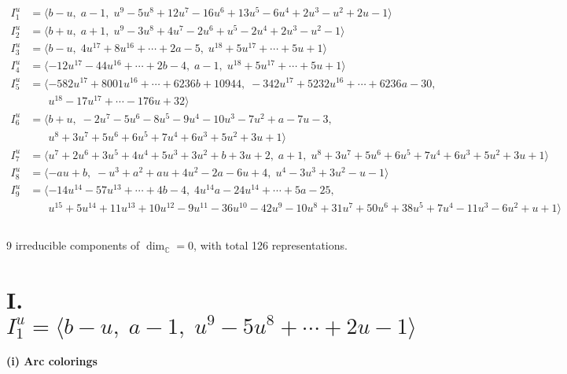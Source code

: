 \documentclass[1p]{elsarticle_modified}
\theoremstyle{definition}
\begin{document}
\begin{align*}
I^u_{1}&=\langle 
b- u,\;a-1,\;u^9-5 u^8+12 u^7-16 u^6+13 u^5-6 u^4+2 u^3- u^2+2 u-1\rangle \\
I^u_{2}&=\langle 
b+u,\;a+1,\;u^9-3 u^8+4 u^7-2 u^6+u^5-2 u^4+2 u^3- u^2-1\rangle \\
I^u_{3}&=\langle 
b- u,\;4 u^{17}+8 u^{16}+\cdots+2 a-5,\;u^{18}+5 u^{17}+\cdots+5 u+1\rangle \\
I^u_{4}&=\langle 
-12 u^{17}-44 u^{16}+\cdots+2 b-4,\;a-1,\;u^{18}+5 u^{17}+\cdots+5 u+1\rangle \\
I^u_{5}&=\langle 
-582 u^{17}+8001 u^{16}+\cdots+6236 b+10944,\;-342 u^{17}+5232 u^{16}+\cdots+6236 a-30,\\
\phantom{I^u_{5}}&\phantom{= \langle  }u^{18}-17 u^{17}+\cdots-176 u+32\rangle \\
I^u_{6}&=\langle 
b+u,\;-2 u^7-5 u^6-8 u^5-9 u^4-10 u^3-7 u^2+a-7 u-3,\\
\phantom{I^u_{6}}&\phantom{= \langle  }u^8+3 u^7+5 u^6+6 u^5+7 u^4+6 u^3+5 u^2+3 u+1\rangle \\
I^u_{7}&=\langle 
u^7+2 u^6+3 u^5+4 u^4+5 u^3+3 u^2+b+3 u+2,\;a+1,\;u^8+3 u^7+5 u^6+6 u^5+7 u^4+6 u^3+5 u^2+3 u+1\rangle \\
I^u_{8}&=\langle 
- a u+b,\;- u^3+a^2+a u+4 u^2-2 a-6 u+4,\;u^4-3 u^3+3 u^2- u-1\rangle \\
I^u_{9}&=\langle 
-14 u^{14}-57 u^{13}+\cdots+4 b-4,\;4 u^{14} a-24 u^{14}+\cdots+5 a-25,\\
\phantom{I^u_{9}}&\phantom{= \langle  }u^{15}+5 u^{14}+11 u^{13}+10 u^{12}-9 u^{11}-36 u^{10}-42 u^9-10 u^8+31 u^7+50 u^6+38 u^5+7 u^4-11 u^3-6 u^2+u+1\rangle \\
\\
\end{align*}
\raggedright * 9 irreducible components of $\dim_{\mathbb{C}}=0$, with total 126 representations.\\
\newpage
\renewcommand{\arraystretch}{1}
\centering \section*{I. $I^u_{1}= \langle b- u,\;a-1,\;u^9-5 u^8+\cdots+2 u-1 \rangle$}
\flushleft \textbf{(i) Arc colorings}\\
\end{document}
